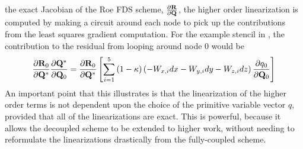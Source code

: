 the exact Jacobian of the Roe FDS scheme, $\frac{\partial \mathbf R}{\partial \mathbf Q}$, the higher order
linearization is computed by making a circuit around each node to pick up the
contributions from the least squares gradient computation.  For the example
stencil in , the contribution to the residual from
looping around node 0 would be
\begin{equation}
  \frac{\partial \mathbf R_0}{\partial \mathbf Q^*}\frac{\partial \mathbf Q^*}{\partial \mathbf Q_0} = \frac{\partial \mathbf R_0}{\partial \mathbf Q^*} \left[\sum_{i=1}^5{(1-\kappa)
  \left( -W_{x,i}dx - W_{y,i}dy - W_{z,i}dz \right) \frac{\partial q_0}{\partial \mathbf Q_0}}\right]
  \label{ho-linearization}
\end{equation}
An important point that this illustrates is that the linearization of the higher
order terms is not dependent upon the choice of the primitive variable vector
$q$, provided that all of the linearizations are exact.  This is powerful,
because it allows the decoupled scheme to be extended to higher work, without
needing to reformulate the linearizations drastically from the fully-coupled
scheme.
